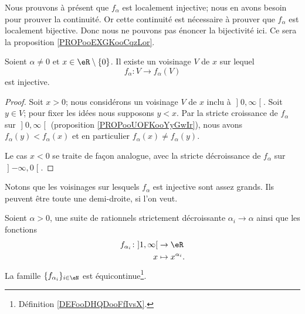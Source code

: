 Nous prouvons à présent que \( f_{\alpha}\) est localement injective; nous en avons besoin pour prouver la continuité. Or cette continuité est nécessaire à prouver que \( f_{\alpha}\) est localement bijective. Donc nous ne pouvons pas énoncer la bijectivité ici. Ce sera la proposition \ref{PROPooEXGKooCqzLor}.

\begin{proposition}     \label{PROPooHKTKooCUEBjh}
	Soient \( \alpha\neq 0\) et \( x\in \eR\setminus\{ 0 \}\). Il existe un voisinage \( V\) de \( x\) sur lequel
	\begin{equation}
		f_{\alpha}\colon V \to f_{\alpha}(V)
	\end{equation}
	est injective.
\end{proposition}

\begin{proof}
	Soit \( x>0 \); nous considérons un voisinage \( V\) de \( x\) inclu à \( \mathopen] 0 , \infty \mathclose[\). Soit \( y\in V\); pour fixer les idées nous supposons \( y<x\). Par la stricte croissance de \( f_{\alpha}\) sur \( \mathopen] 0 , \infty \mathclose[\) (proposition \ref{PROPooUOFKooYyGwIr}), nous avons \( f_{\alpha}(y)<f_{\alpha}(x)\) et en particulier \( f_{\alpha}(x)\neq f_{\alpha}(y)\).

		Le cas \( x<0\) se traite de façon analogue, avec la stricte décroissance de \( f_{\alpha}\) sur \( \mathopen] -\infty , 0 \mathclose[\).
\end{proof}
Notons que les voisinages sur lesquels \( f_{\alpha}\) est injective sont assez grands. Ils peuvent être toute une demi-droite, si l'on veut.

\begin{lemma}   \label{LEMooQTNKooLVEytN}
	Soient \( \alpha>0\), une suite de rationnels strictement décroissante \( \alpha_i\to \alpha\) ainsi que les fonctions
	\begin{equation}
		\begin{aligned}
			f_{\alpha_i}\colon \mathopen] 1 , \infty \mathclose[ & \to \eR               \\
			x                                                    & \mapsto x^{\alpha_i}.
		\end{aligned}
	\end{equation}
	La famille \( \{ f_{\alpha_i} \}_{i\in \eN}\) est équicontinue\footnote{Définition \ref{DEFooDHQDooFfIvsX}.}.
\end{lemma}

